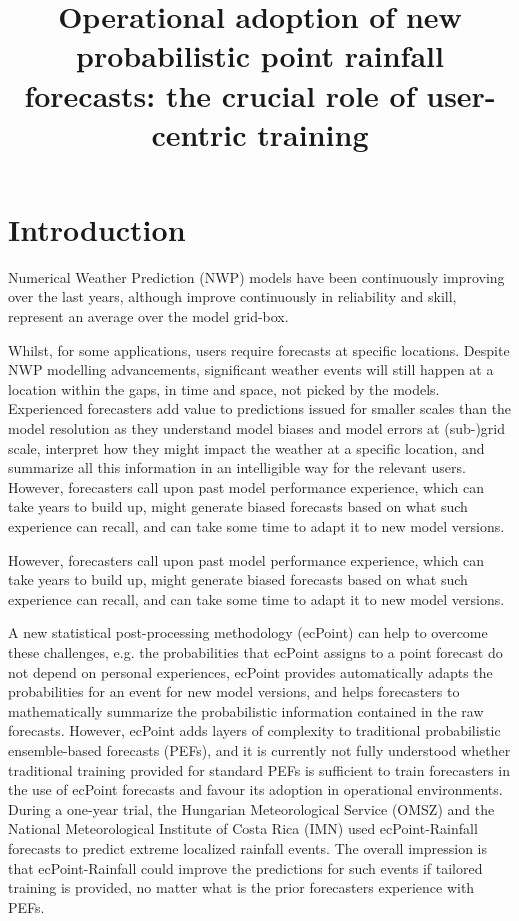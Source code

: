 \documentclass[twocol]{ametsocV5} %
\title{Operational adoption of new probabilistic point rainfall forecasts: the crucial role of user-centric training}
\affiliation{University of Reading, Reading, UK \\
European Centre for Medium-Range Weather Forecasts, Reading, UK}
\begin{document}
\maketitle


\section{Introduction}

Numerical Weather Prediction (NWP) models have been continuously improving over the last years,  although improve continuously in reliability and skill, represent an average over the model grid-box. 

Whilst, for some applications, users require forecasts at specific locations. Despite NWP modelling advancements, significant weather events will still happen at a location within the gaps, in time and space, not picked by the models. Experienced forecasters add value to predictions issued for smaller scales than the model resolution as they understand model biases and model errors at (sub-)grid scale, interpret how they might impact the weather at a specific location, and summarize all this information in an intelligible way for the relevant users. 
However, forecasters call upon past model performance experience, which can take years to build up, might generate biased forecasts based on what such experience can recall, and can take some time to adapt it to new model versions. 

However, forecasters call upon past model performance experience, which can take years to build up, might generate biased forecasts based on what such experience can recall, and can take some time to adapt it to new model versions. 

A new statistical post-processing methodology (ecPoint) can help to overcome these challenges, e.g. the probabilities that ecPoint assigns to a point forecast do not depend on personal experiences, ecPoint provides automatically adapts the probabilities for an event for new model versions, and helps forecasters to mathematically summarize the probabilistic information contained in the raw forecasts. However, ecPoint adds layers of complexity to traditional probabilistic ensemble-based forecasts (PEFs), and it is currently not fully understood whether traditional training provided for standard PEFs is sufficient to train forecasters in the use of ecPoint forecasts and favour its adoption in operational environments. During a one-year trial, the Hungarian Meteorological Service (OMSZ) and the National Meteorological Institute of Costa Rica (IMN) used ecPoint-Rainfall forecasts to predict extreme localized rainfall events. The overall impression is that ecPoint-Rainfall could improve the predictions for such events if tailored training is provided, no matter what is the prior forecasters experience with PEFs.
\end{document}
